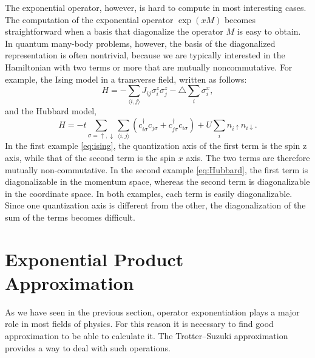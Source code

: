 The exponential operator, however, is hard to compute in most interesting cases. The computation of the exponential operator $\exp{(xM)}$ becomes straightforward when a basis that diagonalize the operator $M$ is easy to obtain. In quantum many-body problems, however, the basis of the diagonalized representation is often nontrivial, because we are typically interested in the Hamiltonian with two terms or more that are mutually noncommutative. For example, the Ising model in a transverse field, written as follows:
\begin{equation} \label{eq:ising}
H = -\sum_{\langle i,j \rangle} J_{ij} \sigma_i^z \sigma_j^z - \triangle\sum_i \sigma_i^x ,
\end{equation}
and the Hubbard model,
\begin{equation} \label{eq:Hubbard}
H = -t \sum_{\sigma = \uparrow ,\downarrow} \sum_{\langle i,j \rangle} (c_{i\sigma}^\dagger c_{j\sigma} + c_{j\sigma}^\dagger c_{i\sigma}) + U\sum_i n_{i\uparrow} n_{i\downarrow} .
\end{equation}
In the first example \eqref{eq:ising}, the quantization axis of the first term is the spin z axis, while that of the second term is the spin $x$ axis. The two terms are therefore mutually non-commutative. In the second example \eqref{eq:Hubbard}, the first term is diagonalizable in the momentum space, whereas the second term is diagonalizable in the coordinate space. In both examples, each term is easily diagonalizable. Since one quantization axis is different from the other, the diagonalization of the sum of the terms becomes difficult.

\section{Exponential Product Approximation}
As we have seen in the previous section, operator exponentiation plays a major role in most fields of physics. For this reason it is necessary to find good approximation to be able to calculate it. The Trotter--Suzuki approximation provides a way to deal with such operations. 

